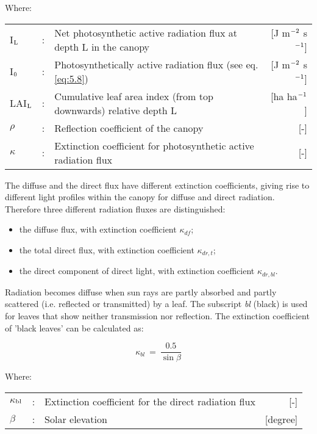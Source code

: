 Where:\\[5pt]
\begin{tabularx}{\textwidth}{llXr}
	I$_{{\rm L}}$   &:& Net photosynthetic active radiation flux at 
	depth L in the canopy    &    [J m$^{{\rm -2}}$ s$^{{\rm -1}}$]\\
	I$_{{\rm 0}}$   &:& Photosynthetically active radiation flux (see eq. \ref{eq:5.8})  & 
	[J m$^{{\rm -2}}$ s$^{{\rm -1}}$]\\
	LAI$_{{\rm L}}$ &:& Cumulative leaf area index (from top downwards) 
	relative depth L & [ha ha$^{{\rm -1}}$]\\
	$\rho$          &:& Reflection coefficient of the canopy   &     [-]\\
	$\kappa$        &:& Extinction coefficient for photosynthetic active 
	radiation flux   &     [-]\\
\end{tabularx}

The diffuse and the direct flux have different extinction coefficients, giving rise to
different light profiles within the canopy for diffuse and direct radiation. Therefore three
different radiation fluxes are distinguished:
\begin{itemize}
	\item the diffuse flux, with extinction coefficient $\kappa_{df}$;
	\item the total direct flux, with extinction coefficient $\kappa_{dr,t}$;
	\item the direct component of direct light, with extinction coefficient $\kappa_{dr,bl}$.
\end{itemize}

Radiation becomes diffuse when sun rays are partly absorbed and partly scattered (i.e.
reflected or transmitted) by a leaf. The subscript {\it bl} (black) is used for leaves that show
neither transmission nor reflection. The extinction coefficient of 'black leaves'
can be calculated as:

\begin{equation}
\label{eq:5.14}
\kappa_{bl} ~=~{\frac{0.5}{\sin \beta }}
\end{equation}

Where:\\[5pt]
\begin{tabularx}{\textwidth}{llXr}
	$\kappa$$_{{\rm bl}}$ &:& Extinction coefficient for the direct radiation flux   &     [-]\\
	$\beta$ &:& Solar elevation    &    [degree]\\
\end{tabularx}

